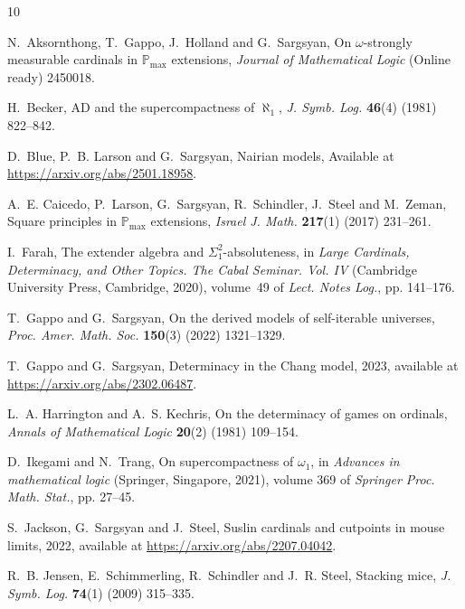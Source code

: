 \documentclass{amsart}
\begin{document}
\begin{thebibliography}{10}
\newcommand{\enquote}[1]{#1}

N.~Aksornthong, T.~Gappo, J.~Holland and G.~Sargsyan, \enquote{On
  $\omega$-strongly measurable cardinals in $\mathbb{P}_{\max}$ extensions},
  \emph{Journal of Mathematical Logic}  (Online ready) 2450018.

H.~Becker, \enquote{{AD and the supercompactness of $\aleph_1$}}, \emph{J.
  Symb. Log.} \textbf{46}(4) (1981) 822–842.

D.~Blue, P.~B. Larson and G.~Sargsyan, \enquote{Nairian models}, Available at
  \url{https://arxiv.org/abs/2501.18958}.

A.~E. Caicedo, P.~Larson, G.~Sargsyan, R.~Schindler, J.~Steel and M.~Zeman,
  \enquote{Square principles in {${\mathbb P}_{\max}$} extensions}, \emph{Israel
  J. Math.} \textbf{217}(1) (2017) 231--261.

I.~Farah, \enquote{The extender algebra and ${\Sigma^2_1}$-absoluteness}, in
  \emph{Large {C}ardinals, {D}eterminacy, and {O}ther {T}opics. {T}he {C}abal
  {S}eminar. {V}ol. {IV}} (Cambridge University Press, Cambridge, 2020),
  volume~49 of \emph{Lect. Notes Log.}, pp. 141--176.

T.~Gappo and G.~Sargsyan, \enquote{On the derived models of self-iterable
  universes}, \emph{Proc. Amer. Math. Soc.} \textbf{150}(3) (2022) 1321--1329.

T.~Gappo and G.~Sargsyan, \enquote{Determinacy in the {C}hang model}, 2023,
  available at \url{https://arxiv.org/abs/2302.06487}.

L.~A. Harrington and A.~S. Kechris, \enquote{On the determinacy of games on
  ordinals}, \emph{Annals of Mathematical Logic} \textbf{20}(2) (1981)
  109--154.

D.~Ikegami and N.~Trang, \enquote{On supercompactness of {$\omega_1$}}, in
  \emph{Advances in mathematical logic} (Springer, Singapore, 2021), volume 369
  of \emph{Springer Proc. Math. Stat.}, pp. 27--45.

S.~Jackson, G.~Sargsyan and J.~Steel, \enquote{Suslin cardinals and cutpoints
  in mouse limits}, 2022, available at \url{https://arxiv.org/abs/2207.04042}.

R.~B. Jensen, E.~Schimmerling, R.~Schindler and J.~R. Steel, \enquote{Stacking
  mice}, \emph{{J. Symb. Log.}} \textbf{74}(1) (2009) 315--335.


\end{thebibliography}
\end{document}
